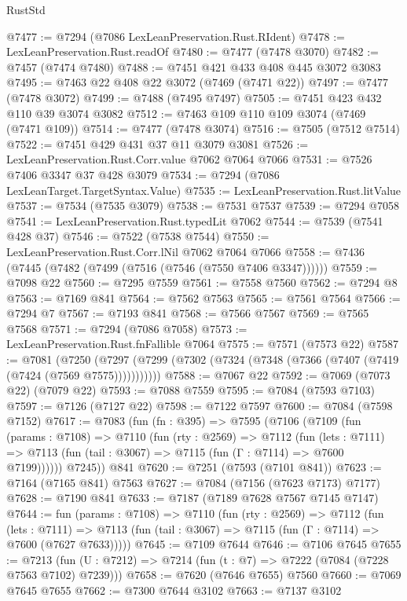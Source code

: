 \begin{lexlean}{RustStd}
\begin{coremodule}
@7477 := @7294 (@7086 LexLeanPreservation.Rust.RIdent)
@7478 := LexLeanPreservation.Rust.readOf
@7480 := @7477 (@7478 @3070)
@7482 := @7457 (@7474 @7480)
@7488 := @7451 @421 @433 @408 @445 @3072 @3083
@7495 := @7463 @22 @408 @22 @3072 (@7469 (@7471 @22))
@7497 := @7477 (@7478 @3072)
@7499 := @7488 (@7495 @7497)
@7505 := @7451 @423 @432 @110 @39 @3074 @3082
@7512 := @7463 @109 @110 @109 @3074 (@7469 (@7471 @109))
@7514 := @7477 (@7478 @3074)
@7516 := @7505 (@7512 @7514)
@7522 := @7451 @429 @431 @37 @11 @3079 @3081
@7526 := LexLeanPreservation.Rust.Corr.value @7062 @7064 @7066
@7531 := @7526 @7406 @3347 @37 @428 @3079
@7534 := @7294 (@7086 LexLeanTarget.TargetSyntax.Value)
@7535 := LexLeanPreservation.Rust.litValue
@7537 := @7534 (@7535 @3079)
@7538 := @7531 @7537
@7539 := @7294 @7058
@7541 := LexLeanPreservation.Rust.typedLit @7062
@7544 := @7539 (@7541 @428 @37)
@7546 := @7522 (@7538 @7544)
@7550 := LexLeanPreservation.Rust.Corr.lNil @7062 @7064 @7066
@7558 := @7436 (@7445 (@7482 (@7499 (@7516 (@7546 (@7550 @7406 @3347))))))
@7559 := @7098 @22
@7560 := @7295 @7559
@7561 := @7558 @7560
@7562 := @7294 @8
@7563 := @7169 @841
@7564 := @7562 @7563
@7565 := @7561 @7564
@7566 := @7294 @7
@7567 := @7193 @841
@7568 := @7566 @7567
@7569 := @7565 @7568
@7571 := @7294 (@7086 @7058)
@7573 := LexLeanPreservation.Rust.fnFallible @7064
@7575 := @7571 (@7573 @22)
@7587 := @7081
    (@7250 (@7297 (@7299 (@7302 (@7324 (@7348 (@7366 (@7407 (@7419 (@7424 (@7569 @7575)))))))))))
@7588 := @7067 @22
@7592 := @7069 (@7073 @22) (@7079 @22)
@7593 := @7088 @7559
@7595 := @7084 (@7593 @7103)
@7597 := @7126 (@7127 @22)
@7598 := @7122 @7597
@7600 := @7084 (@7598 @7152)
@7617 := @7083
    (fun (fn : @395) =>
    @7595
      (@7106
        (@7109
          (fun (params : @7108) =>
          @7110
            (fun (rty : @2569) =>
            @7112
              (fun (lets : @7111) =>
              @7113 (fun (tail : @3067) => @7115 (fun (Γ : @7114) => @7600 @7199))))))
        @7245))
    @841
@7620 := @7251 (@7593 (@7101 @841))
@7623 := @7164 (@7165 @841) @7563
@7627 := @7084 (@7156 (@7623 @7173) @7177)
@7628 := @7190 @841
@7633 := @7187 (@7189 @7628 @7567 @7145 @7147)
@7644 := fun (params : @7108) =>
  @7110
    (fun (rty : @2569) =>
    @7112
      (fun (lets : @7111) =>
      @7113 (fun (tail : @3067) => @7115 (fun (Γ : @7114) => @7600 (@7627 @7633)))))
@7645 := @7109 @7644
@7646 := @7106 @7645
@7655 := @7213 (fun (U : @7212) => @7214 (fun (t : @7) => @7222 (@7084 (@7228 @7563 @7102) @7239)))
@7658 := @7620 (@7646 @7655) @7560
@7660 := @7069 @7645 @7655
@7662 := @7300 @7644 @3102
@7663 := @7137 @3102

\end{coremodule}
\end{lexlean}
